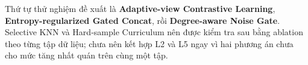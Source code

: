 Thứ tự thử nghiệm đề xuất là \textbf{Adaptive-view Contrastive Learning}, \textbf{Entropy-regularized Gated Concat}, rồi \textbf{Degree-aware Noise Gate}. Selective KNN và Hard-sample Curriculum nên được kiểm tra sau bằng ablation theo từng tập dữ liệu; chưa nên kết hợp L2 và L5 ngay vì hai phương án chưa cho mức tăng nhất quán trên cùng một tập.
